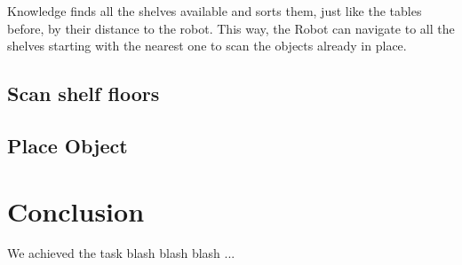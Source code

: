 \documentclass[main.tex]{subfiles}
\begin{document}
	
Knowledge finds all the shelves available and sorts them, just like the tables before, by their distance to the robot. This way, the Robot can navigate to all the shelves starting with the nearest one to scan the objects already in place.
	
	
	\subsection{Scan shelf floors}
	
	
	
	
	
	
	\subsection{Place Object}
	
	
	
	
	\section{Conclusion}

	We achieved the task blash blash blash ...
	
	
	\endgroup
	
\end{document}
